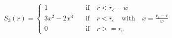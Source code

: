 \documentclass[12pt]{article}
\begin{document}
\thispagestyle{empty}

\begin{eqnarray*}
 S_3(r) = \left\lbrace \begin{array}{ll}
                     1 & \quad\mathrm{if}\quad r < r_\mathrm{c} - w \\
                     3x^2 - 2x^3 & \quad\mathrm{if}\quad r < r_\mathrm{c} \quad\mathrm{with\quad} x=\frac{r_\mathrm{c} - r}{w} \\
                     0 & \quad\mathrm{if}\quad r >= r_\mathrm{c}
                 \end{array} \right.
\end{eqnarray*}
\end{document}
